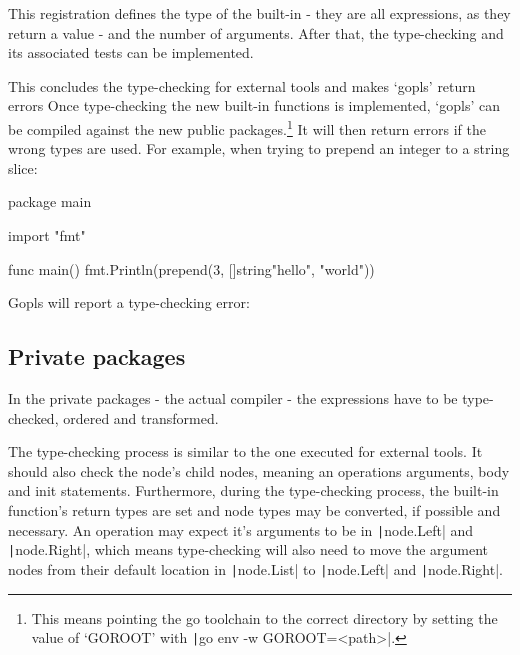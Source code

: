 \begin{code}
\end{code}

This registration defines the type of the built-in - they are all expressions,
as they return a value - and the number of arguments.
After that, the type-checking and its associated tests can be implemented.

This concludes the type-checking for external tools and makes `gopls' return errors
Once type-checking the new built-in functions is implemented, `gopls' can be
compiled against the new public packages.\footnote{
This means pointing the go toolchain to the correct directory by setting
the value of `GOROOT' with \texttt|go env -w GOROOT=<path>|.
}
It will then return errors if the wrong types are used. For example, when trying
to prepend an integer to a string slice:

\begin{gocode}
package main

import "fmt"

func main() {
    fmt.Println(prepend(3, []string{"hello", "world"}))
}
\end{gocode}

Gopls will report a type-checking error:

\subsection{Private packages}

In the private packages - the actual compiler - the expressions have to be
type-checked, ordered and transformed.

The type-checking process is similar to the one executed for external tools.
It should also check the node's child nodes, meaning an operations
arguments, body and init statements. Furthermore, during the type-checking
process, the built-in function's return types are set and node types
may be converted, if possible and necessary.
An operation may expect it's arguments to be in \texttt|node.Left|
and \texttt|node.Right|, which means type-checking will also need
to move the argument nodes from their default location in
\texttt|node.List| to \texttt|node.Left| and
\texttt|node.Right|.

